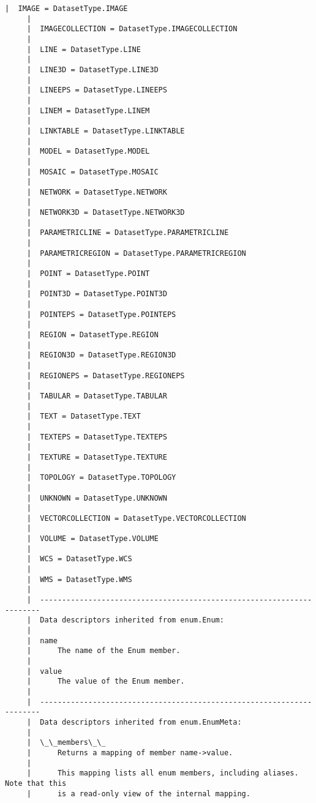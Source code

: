 \documentclass[11pt]{article}
\begin{document}
\begin{Verbatim}[commandchars=\\\{\}]
     |  IMAGE = DatasetType.IMAGE
     |  
     |  IMAGECOLLECTION = DatasetType.IMAGECOLLECTION
     |  
     |  LINE = DatasetType.LINE
     |  
     |  LINE3D = DatasetType.LINE3D
     |  
     |  LINEEPS = DatasetType.LINEEPS
     |  
     |  LINEM = DatasetType.LINEM
     |  
     |  LINKTABLE = DatasetType.LINKTABLE
     |  
     |  MODEL = DatasetType.MODEL
     |  
     |  MOSAIC = DatasetType.MOSAIC
     |  
     |  NETWORK = DatasetType.NETWORK
     |  
     |  NETWORK3D = DatasetType.NETWORK3D
     |  
     |  PARAMETRICLINE = DatasetType.PARAMETRICLINE
     |  
     |  PARAMETRICREGION = DatasetType.PARAMETRICREGION
     |  
     |  POINT = DatasetType.POINT
     |  
     |  POINT3D = DatasetType.POINT3D
     |  
     |  POINTEPS = DatasetType.POINTEPS
     |  
     |  REGION = DatasetType.REGION
     |  
     |  REGION3D = DatasetType.REGION3D
     |  
     |  REGIONEPS = DatasetType.REGIONEPS
     |  
     |  TABULAR = DatasetType.TABULAR
     |  
     |  TEXT = DatasetType.TEXT
     |  
     |  TEXTEPS = DatasetType.TEXTEPS
     |  
     |  TEXTURE = DatasetType.TEXTURE
     |  
     |  TOPOLOGY = DatasetType.TOPOLOGY
     |  
     |  UNKNOWN = DatasetType.UNKNOWN
     |  
     |  VECTORCOLLECTION = DatasetType.VECTORCOLLECTION
     |  
     |  VOLUME = DatasetType.VOLUME
     |  
     |  WCS = DatasetType.WCS
     |  
     |  WMS = DatasetType.WMS
     |  
     |  ----------------------------------------------------------------------
     |  Data descriptors inherited from enum.Enum:
     |  
     |  name
     |      The name of the Enum member.
     |  
     |  value
     |      The value of the Enum member.
     |  
     |  ----------------------------------------------------------------------
     |  Data descriptors inherited from enum.EnumMeta:
     |  
     |  \_\_members\_\_
     |      Returns a mapping of member name->value.
     |      
     |      This mapping lists all enum members, including aliases. Note that this
     |      is a read-only view of the internal mapping.
    

\end{Verbatim}
\end{document}
